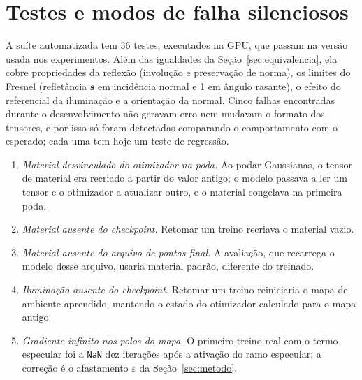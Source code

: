 \documentclass[12pt]{article}
\newcommand{\bs}{\mathbf{s}}
\begin{document}
\section{Testes e modos de falha silenciosos}
\label{sec:testes}
A suíte automatizada tem 36 testes, executados na GPU, que passam na versão usada nos experimentos.
Além das igualdades da Seção~\ref{sec:equivalencia}, ela cobre propriedades da reflexão (involução e preservação de norma), os limites do Fresnel (refletância $\bs$ em incidência normal e 1 em ângulo rasante), o efeito do referencial da iluminação e a orientação da normal.
Cinco falhas encontradas durante o desenvolvimento não geravam erro nem mudavam o formato dos tensores, e por isso só foram detectadas comparando o comportamento com o esperado; cada uma tem hoje um teste de regressão.
\begin{enumerate}
\item \emph{Material desvinculado do otimizador na poda.} Ao podar Gaussianas, o tensor de material era recriado a partir do valor antigo; o modelo passava a ler um tensor e o otimizador a atualizar outro, e o material congelava na primeira poda.
\item \emph{Material ausente do \emph{checkpoint}.} Retomar um treino recriava o material vazio.
\item \emph{Material ausente do arquivo de pontos final.} A avaliação, que recarrega o modelo desse arquivo, usaria material padrão, diferente do treinado.
\item \emph{Iluminação ausente do \emph{checkpoint}.} Retomar um treino reiniciaria o mapa de ambiente aprendido, mantendo o estado do otimizador calculado para o mapa antigo.
\item \emph{Gradiente infinito nos polos do mapa.} O primeiro treino real com o termo especular foi a \texttt{NaN} dez iterações após a ativação do ramo especular; a correção é o afastamento $\varepsilon$ da Seção~\ref{sec:metodo}.
\end{enumerate}
\end{document}
